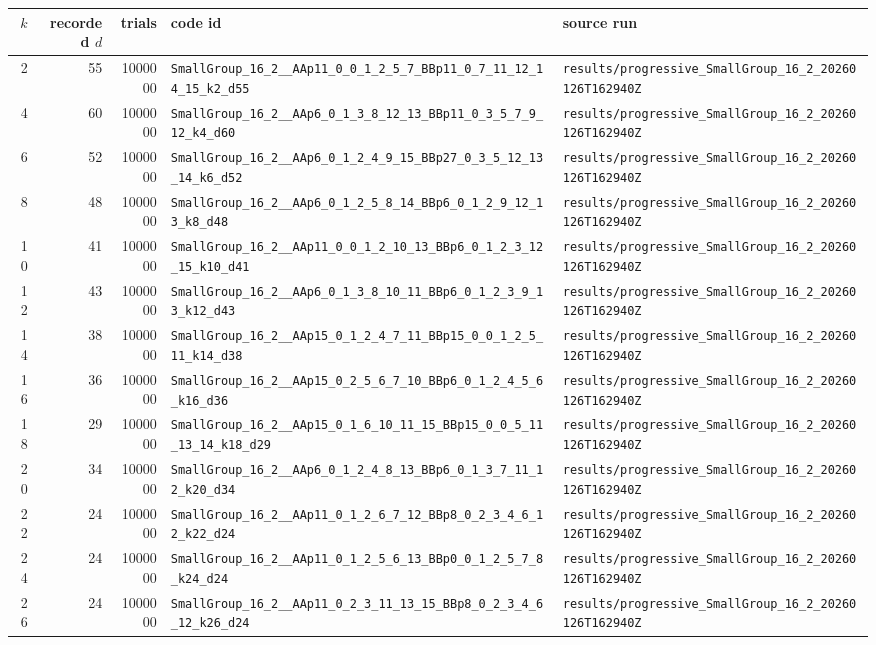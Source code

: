 \documentclass[11pt]{article}
\begin{document}
\begin{longtable}{@{}r r r l l@{}}
\toprule
$k$ & recorded $d$ & trials & code id & source run \\
\midrule
\endhead
2 & 55 & 1000000 & \texttt{SmallGroup\_16\_2\_\_AAp11\_0\_0\_1\_2\_5\_7\_BBp11\_0\_7\_11\_12\_14\_15\_k2\_d55} & \texttt{results/progressive\_SmallGroup\_16\_2\_20260126T162940Z} \\
4 & 60 & 1000000 & \texttt{SmallGroup\_16\_2\_\_AAp6\_0\_1\_3\_8\_12\_13\_BBp11\_0\_3\_5\_7\_9\_12\_k4\_d60} & \texttt{results/progressive\_SmallGroup\_16\_2\_20260126T162940Z} \\
6 & 52 & 1000000 & \texttt{SmallGroup\_16\_2\_\_AAp6\_0\_1\_2\_4\_9\_15\_BBp27\_0\_3\_5\_12\_13\_14\_k6\_d52} & \texttt{results/progressive\_SmallGroup\_16\_2\_20260126T162940Z} \\
8 & 48 & 1000000 & \texttt{SmallGroup\_16\_2\_\_AAp6\_0\_1\_2\_5\_8\_14\_BBp6\_0\_1\_2\_9\_12\_13\_k8\_d48} & \texttt{results/progressive\_SmallGroup\_16\_2\_20260126T162940Z} \\
10 & 41 & 1000000 & \texttt{SmallGroup\_16\_2\_\_AAp11\_0\_0\_1\_2\_10\_13\_BBp6\_0\_1\_2\_3\_12\_15\_k10\_d41} & \texttt{results/progressive\_SmallGroup\_16\_2\_20260126T162940Z} \\
12 & 43 & 1000000 & \texttt{SmallGroup\_16\_2\_\_AAp6\_0\_1\_3\_8\_10\_11\_BBp6\_0\_1\_2\_3\_9\_13\_k12\_d43} & \texttt{results/progressive\_SmallGroup\_16\_2\_20260126T162940Z} \\
14 & 38 & 1000000 & \texttt{SmallGroup\_16\_2\_\_AAp15\_0\_1\_2\_4\_7\_11\_BBp15\_0\_0\_1\_2\_5\_11\_k14\_d38} & \texttt{results/progressive\_SmallGroup\_16\_2\_20260126T162940Z} \\
16 & 36 & 1000000 & \texttt{SmallGroup\_16\_2\_\_AAp15\_0\_2\_5\_6\_7\_10\_BBp6\_0\_1\_2\_4\_5\_6\_k16\_d36} & \texttt{results/progressive\_SmallGroup\_16\_2\_20260126T162940Z} \\
18 & 29 & 1000000 & \texttt{SmallGroup\_16\_2\_\_AAp15\_0\_1\_6\_10\_11\_15\_BBp15\_0\_0\_5\_11\_13\_14\_k18\_d29} & \texttt{results/progressive\_SmallGroup\_16\_2\_20260126T162940Z} \\
20 & 34 & 1000000 & \texttt{SmallGroup\_16\_2\_\_AAp6\_0\_1\_2\_4\_8\_13\_BBp6\_0\_1\_3\_7\_11\_12\_k20\_d34} & \texttt{results/progressive\_SmallGroup\_16\_2\_20260126T162940Z} \\
22 & 24 & 1000000 & \texttt{SmallGroup\_16\_2\_\_AAp11\_0\_1\_2\_6\_7\_12\_BBp8\_0\_2\_3\_4\_6\_12\_k22\_d24} & \texttt{results/progressive\_SmallGroup\_16\_2\_20260126T162940Z} \\
24 & 24 & 1000000 & \texttt{SmallGroup\_16\_2\_\_AAp11\_0\_1\_2\_5\_6\_13\_BBp0\_0\_1\_2\_5\_7\_8\_k24\_d24} & \texttt{results/progressive\_SmallGroup\_16\_2\_20260126T162940Z} \\
26 & 24 & 1000000 & \texttt{SmallGroup\_16\_2\_\_AAp11\_0\_2\_3\_11\_13\_15\_BBp8\_0\_2\_3\_4\_6\_12\_k26\_d24} & \texttt{results/progressive\_SmallGroup\_16\_2\_20260126T162940Z} \\
\bottomrule
\end{longtable}
\end{document}
